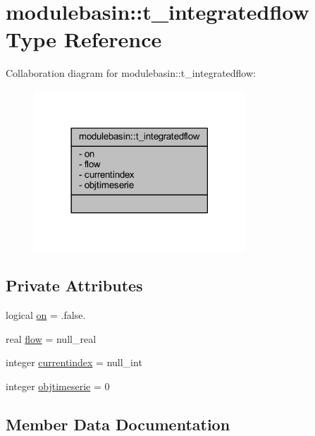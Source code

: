 \hypertarget{structmodulebasin_1_1t__integratedflow}{}\section{modulebasin\+:\+:t\+\_\+integratedflow Type Reference}
\label{structmodulebasin_1_1t__integratedflow}


Collaboration diagram for modulebasin\+:\+:t\+\_\+integratedflow\+:\nopagebreak
\begin{figure}[H]
\begin{center}
\leavevmode
\includegraphics[width=225pt]{structmodulebasin_1_1t__integratedflow__coll__graph}
\end{center}
\end{figure}
\subsection*{Private Attributes}
\begin{DoxyCompactItemize}
\item 
logical \mbox{\hyperlink{structmodulebasin_1_1t__integratedflow_a3c0842330500f63c73c5de570817500c}{on}} = .false.
\item 
real \mbox{\hyperlink{structmodulebasin_1_1t__integratedflow_af5877c02291e3e49d216e878e68930a7}{flow}} = null\+\_\+real
\item 
integer \mbox{\hyperlink{structmodulebasin_1_1t__integratedflow_ad2d5aea98b8137fd234f1fdcc6a464c7}{currentindex}} = null\+\_\+int
\item 
integer \mbox{\hyperlink{structmodulebasin_1_1t__integratedflow_acaa0480a3b28991ca76828608e52f92e}{objtimeserie}} = 0
\end{DoxyCompactItemize}


\subsection{Member Data Documentation}
\mbox{\label{structmodulebasin_1_1t__integratedflow_ad2d5aea98b8137fd234f1fdcc6a464c7}} 
